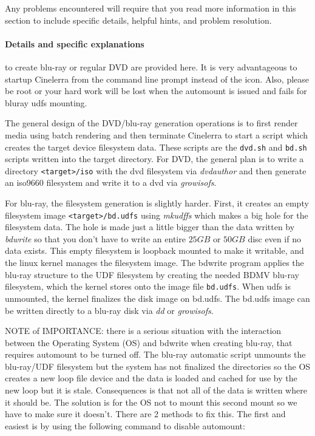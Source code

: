 Any problems encountered will require that you read more information in this section to include specific details, helpful hints, and problem resolution.

\paragraph{Details and specific explanations} to create blu-ray or regular DVD are provided here.  It is very advantageous to startup Cinelerra from the command line prompt instead of the icon.  Also, please be root or your hard work will be lost when the automount is issued and fails for bluray udfs mounting.

The general design of the DVD/blu-ray generation operations is to first render media using batch rendering and then terminate Cinelerra to start a script which creates the target device filesystem data.  These scripts are the \texttt{dvd.sh} and \texttt{bd.sh} scripts written into the target directory.  For DVD, the general plan is to write a directory \texttt{<target>/iso} with the dvd filesystem via \textit{dvdauthor} and then generate an iso9660 filesystem and write it to a dvd via \textit{growisofs}.  

For blu-ray, the filesystem generation is slightly harder.  First, it creates an empty filesystem image \texttt{<target>/bd.udfs} using \textit{mkudffs} which makes a big hole for the filesystem data. The hole is made just a little bigger than the data written by \textit{bdwrite} so that you don't have to write an entire $25GB$ or $50GB$ disc even if no data exists. This empty filesystem is loopback mounted to make it writable, and the linux kernel manages the filesystem image. The bdwrite program applies the blu-ray structure to the UDF filesystem by creating the needed BDMV blu-ray filesystem, which the kernel stores onto the image file \texttt{bd.udfs}.  When udfs is unmounted, the kernel finalizes the disk image on bd.udfs.  The bd.udfs image can be written directly to a blu-ray disk via \textit{dd} or \textit{growisofs}. 

NOTE of IMPORTANCE: there is a serious situation with the interaction between the Operating System (OS) and bdwrite when creating blu-ray, that requires automount to be turned off.  The blu-ray automatic script unmounts the blu-ray/UDF filesystem but the system has not finalized the directories so the OS creates a new loop file device and the data is loaded and cached for use by the new loop but it is stale.  Consequences is that not all of the data is written where it should be.  The solution is for the OS not to mount this second mount so we have to make sure it doesn't.  There are 2 methods to fix this.  The first and easiest is by using the following command to disable automount:

